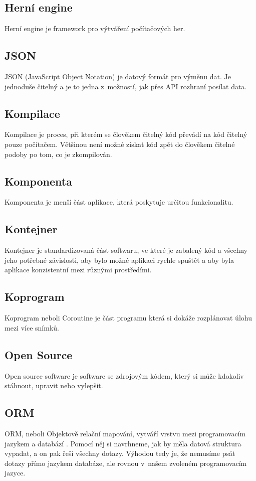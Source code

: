 \subsection{Herní engine}
Herní engine je framework pro výtváření počítačových her.

\subsection{JSON}
JSON (JavaScript Object Notation) je datový formát pro výměnu dat. Je jednoduše čitelný a je to jedna z~možností, jak přes API rozhraní posílat data. \cite{JSON}

\subsection{Kompilace}
Kompilace je proces, při kterém se člověkem čitelný kód převádí na kód čitelný pouze počítačem. Většinou není možné získat kód zpět do člověkem čitelné podoby po tom, co je zkompilován.

\subsection{Komponenta}
Komponenta je menší část aplikace, která poskytuje určitou funkcionalitu.

\subsection{Kontejner}
Kontejner je standardizovaná část softwaru, ve které je zabalený kód a všechny jeho potřebné závislosti, aby bylo možné aplikaci rychle spuštět a aby byla aplikace konzistentní mezi různými prostředími. \cite{Kontejner}

\subsection{Koprogram}
Koprogram neboli Coroutine je část programu která si dokáže rozplánovat úlohu mezi více snímků.\cite{Coroutine} 

\subsection{Open Source}
Open source software je software se zdrojovým kódem, který si může kdokoliv stáhnout, upravit nebo vylepšit. \cite{OpenSource}

\subsection{ORM}
ORM, neboli Objektově relační mapování, vytváří vrstvu mezi programovacím jazykem a databází \cite{ORM}. Pomocí něj si navrhneme, jak by měla datová struktura vypadat, a on pak řeší všechny dotazy. Výhodou tedy je, že nemusíme psát dotazy přímo jazykem databáze, ale rovnou v~našem zvoleném programovacím jazyce.


